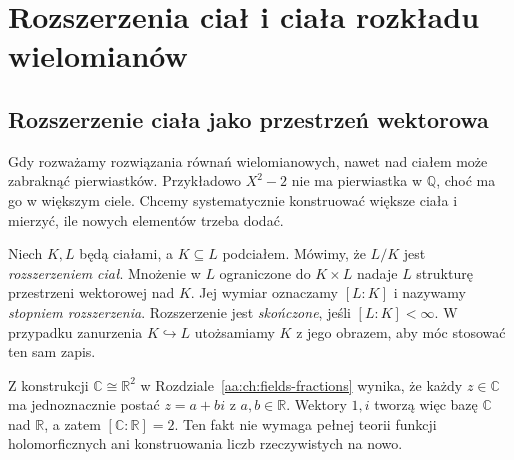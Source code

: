 \chapter{Rozszerzenia ciał i ciała rozkładu wielomianów}
\label{aa:ch:field-extensions}

\section{Rozszerzenie ciała jako przestrzeń wektorowa}
Gdy rozważamy rozwiązania równań wielomianowych, nawet nad
ciałem może zabraknąć pierwiastków. Przykładowo
$X^2-2$ nie ma pierwiastka w $\mathbb Q$, choć ma go
w większym ciele. Chcemy systematycznie konstruować
większe ciała i mierzyć, ile nowych elementów trzeba dodać.

\begin{definicja}
\label{aa:def:field-extension-degree}
Niech $K,L$ będą ciałami, a $K\subseteq L$ podciałem.
Mówimy, że $L/K$ jest \emph{rozszerzeniem ciał}.
Mnożenie w $L$ ograniczone do $K\times L$ nadaje $L$
strukturę przestrzeni wektorowej nad $K$.
Jej wymiar oznaczamy $[L:K]$ i nazywamy
\emph{stopniem rozszerzenia}. Rozszerzenie jest
\emph{skończone}, jeśli $[L:K]<\infty$.
W przypadku zanurzenia $K\hookrightarrow L$ utożsamiamy
$K$ z jego obrazem, aby móc stosować ten sam zapis.
\end{definicja}

\begin{przyklad}
\label{aa:prz:complex-degree}
Z konstrukcji $\mathbb C\cong\mathbb R^2$ w
Rozdziale~\ref{aa:ch:fields-fractions} wynika, że
każdy $z\in\mathbb C$ ma jednoznacznie postać
$z=a+bi$ z $a,b\in\mathbb R$. Wektory $1,i$
tworzą więc bazę $\mathbb C$ nad $\mathbb R$, a zatem
$[\mathbb C:\mathbb R]=2$. Ten fakt nie wymaga
pełnej teorii funkcji holomorficznych ani konstruowania
liczb rzeczywistych na nowo.
\end{przyklad}


